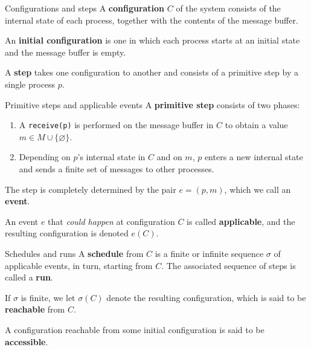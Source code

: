 \documentclass[12pt]{beamer}
\begin{document}
  \begin{frame}{Configurations and steps}
    A \textbf{configuration} \(C\) of the system consists of the internal state
    of each process, together with the contents of the message buffer.

    \vspace{0.25cm}

    An \textbf{initial configuration} is one in which each process starts at an
    initial state and the message buffer is empty.

    \vspace{0.5cm}

    A \textbf{step} takes one configuration to another and consists of a
    primitive step by a single process \(p\).
  \end{frame}

  \begin{frame}{Primitive steps and applicable events}
    A \textbf{primitive step} consists of two phases:
    \begin{enumerate}
      \item A \texttt{receive(p)} is performed on the message buffer in \(C\)
        to obtain a value \(m\in M\cup\{\varnothing\}\).
      \item Depending on \(p\)'s internal state in \(C\) and on \(m\), \(p\)
        enters a new internal state and sends a finite set of messages to other
        processes.
    \end{enumerate}

    \vspace{0.25cm}

    The step is completely determined by the pair \(e = (p,m)\), which we call
    an \textbf{event}.

    \vspace{0.25cm}

    An event \(e\) that \emph{could happen} at configuration \(C\) is called
    \textbf{applicable}, and the resulting configuration is denoted \(e(C)\).
  \end{frame}

  \begin{frame}{Schedules and runs}
    A \textbf{schedule} from \(C\) is a finite or infinite sequence \(\sigma\)
    of applicable events, in turn, starting from \(C\). The associated sequence
    of steps is called a \textbf{run}.

    \vspace{0.25cm}

    If \(\sigma\) is finite, we let \(\sigma(C)\) denote the resulting
    configuration, which is said to be \textbf{reachable} from \(C\).

    \vspace{0.25cm}

    A configuration reachable from some initial configuration is said to be
    \textbf{accessible}.
  \end{frame}
\end{document}
